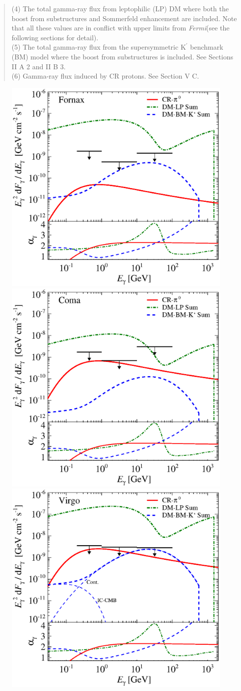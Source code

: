\documentclass[10pt,aps,pra,reprint,amsmath,amsfonts,amssymb,showpacs,nofootinbib,floatfix]{revtex4-1}
\newcommand{\Fermi}{{\em Fermi}\xspace}
\newcommand{\rmn}{\mathrm}
\newcommand{\Kp}{\rmn{K}^\prime}
\begin{document}
\begin{table}
\begin{minipage}{2.0\columnwidth}
\begin{quote}
  (4) The total gamma-ray flux from leptophilic (LP) DM where both the
  boost from substructures and Sommerfeld enhancement are
  included. Note that all these values are in conflict with upper limits from
  \Fermi (see the following sections for detail).\\
  (5) The total gamma-ray flux from the supersymmetric $\Kp$ benchmark (BM)
  model where the boost from substructures is included. See Sections II A 2 and II B 3.\\
  (6) Gamma-ray flux induced by CR protons. See Section V C.
 \label{tab:flux_tab}
  \end{quote}
\end{minipage}
\end{table}


\begin{figure}
\begin{minipage}{2.0\columnwidth}
 \includegraphics[width=0.49\columnwidth]{figures/flux.cluster.Fornax.v14.0.1deg.1.6T.SubMass.SF700.IR2.noMW.woGal.eps}
\includegraphics[width=0.49\columnwidth]{figures/flux.cluster.Coma.v14.0.1deg.1.6T.SubMass.SF700.IR2.noMW.woGal.eps}
\includegraphics[width=0.49\columnwidth]{figures/flux.cluster.Virgo.v14.0.1deg.1.6T.SubMass.SF700.IR2.noMW.woGal.eps}

\end{minipage}
\end{figure}
\end{document}
